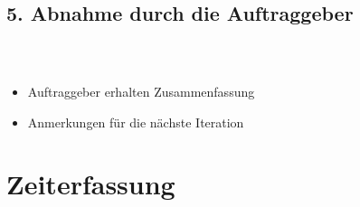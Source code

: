 \documentclass[accentcolor=tud1b,colorbacktitle,landscape,german,presentation]{tudbeamer}
\newcommand{\ftitle}{
	\frametitle{\insertsectionhead \\ {\small \insertsubsectionhead}}
}
\begin{document}
\subsection{5. Abnahme durch die Auftraggeber}
\begin{frame}
	\ftitle
	\centering
	\vspace{-1.2cm}
	\vspace{-4.5cm}
	\begin{itemize}
		\item Auftraggeber erhalten Zusammenfassung\pause
		\item Anmerkungen für die nächste Iteration
	\end{itemize}
\end{frame}

\section{Zeiterfassung}
\end{document}
